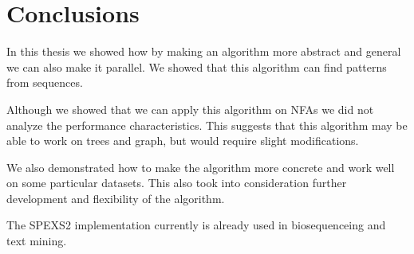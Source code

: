 \chapter{Conclusions}
\label{c:conclusions}

\WIP










In this thesis we showed how by making an algorithm more abstract and general we can also make it parallel. We showed that this algorithm can find patterns from sequences.

Although we showed that we can apply this algorithm on NFAs we did not analyze the performance characteristics. This suggests that this algorithm may be able to work on trees and graph, but would require slight modifications.

We also demonstrated how to make the algorithm more concrete and work well on some particular datasets. This also took into consideration further development and flexibility of the algorithm.

The SPEXS2 implementation currently is already used in biosequenceing and text mining.
